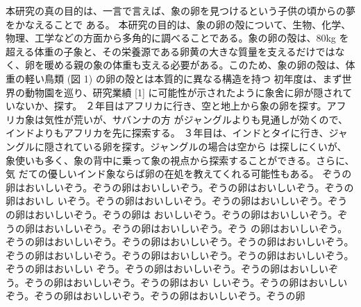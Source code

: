 


本研究の真の目的は、一言で言えば、象の卵を見つけるという子供の頃からの夢をかなえることで
ある。
本研究の目的は、象の卵の殻について、生物、化学、物理、工学などの方面から多角的に調べることである。象の卵の殻は、80kg を超える体重の子象と、その栄養源である卵黄の大きな質量を支えるだけではなく、卵を暖める親の象の体重も支える必要がある。このため、象の卵の殻は、体重の軽い鳥類 (図 1) の卵の殻とは本質的に異なる構造を持つ
初年度は、まず世界の動物園を巡り、研究業績 [1] に可能性が示されたように象舍に卵が隠されて
いないか、探す。
２年目はアフリカに行き、空と地上から象の卵を探す。アフリカ象は気性が荒いが、サバンナの方
がジャングルよりも見通しが効くので、インドよりもアフリカを先に探索する。
３年目は、インドとタイに行き、ジャングルに隠されている卵を探す。ジャングルの場合は空から
は探しにくいが、象使いも多く、象の背中に乗って象の視点から探索することができる。さらに、気
だての優しいインド象ならば卵の在処を教えてくれる可能性もある。
ぞうの卵はおいしいぞう。ぞうの卵はおいしいぞう。ぞうの卵はおいしいぞう。ぞうの卵はおいし
いぞう。ぞうの卵はおいしいぞう。ぞうの卵はおいしいぞう。ぞうの卵はおいしいぞう。ぞうの卵は
おいしいぞう。ぞうの卵はおいしいぞう。ぞうの卵はおいしいぞう。ぞうの卵はおいしいぞう。ぞう
の卵はおいしいぞう。ぞうの卵はおいしいぞう。ぞうの卵はおいしいぞう。ぞうの卵はおいしいぞう。
ぞうの卵はおいしいぞう。ぞうの卵はおいしいぞう。ぞうの卵はおいしいぞう。ぞうの卵はおいしい
ぞう。ぞうの卵はおいしいぞう。ぞうの卵はおいしいぞう。ぞうの卵はおいしいぞう。ぞうの卵はおい
しいぞう。ぞうの卵はおいしいぞう。ぞうの卵はおいしいぞう。ぞうの卵はおいしいぞう。ぞうの卵

